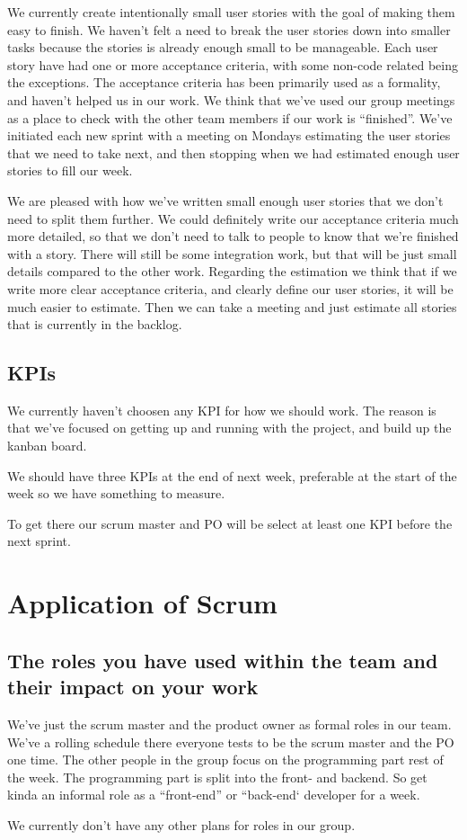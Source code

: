 \documentclass{scrartcl}
\begin{document}
We currently create intentionally small user stories with the goal of making them easy to finish.
We haven't felt a need to break the user stories down into smaller tasks because the stories is already enough small to be manageable.
Each user story have had one or more acceptance criteria, with some non-code related being the exceptions.
The acceptance criteria has been primarily used as a formality, and haven't helped us in our work.
We think that we've used our group meetings as a place to check with the other team members if our work is ``finished''.
We've initiated each new sprint with a meeting on Mondays estimating the user stories that we need to take next, and then stopping when we had estimated enough user stories to fill our week.

We are pleased with how we've written small enough user stories that we don't need to split them further.
We could definitely write our acceptance criteria much more detailed, so that we don't need to talk to people to know that we're finished with a story.
There will still be some integration work, but that will be just small details compared to the other work.
Regarding the estimation we think that if we write more clear acceptance criteria, and clearly define our user stories, it will be much easier to estimate.
Then we can take a meeting and just estimate all stories that is currently in the backlog.


\subsection{KPIs}

We currently haven't choosen any KPI for how we should work.
The reason is that we've focused on getting up and running with the project, and build up the kanban board.

We should have three KPIs at the end of next week, preferable at the start of the week so we have something to measure.

To get there our scrum master and PO will be select at least one KPI before the next sprint.

\section{Application of Scrum}

\subsection{The roles you have used within the team and their impact on your work}

We've just the scrum master and the product owner as formal roles in our team.
We've a rolling schedule there everyone tests to be the scrum master and the PO one time.
The other people in the group focus on the programming part rest of the week.
The programming part is split into the front- and backend.
So get kinda an informal role as a ``front-end'' or ``back-end` developer for a week.

We currently don't have any other plans for roles in our group.
\end{document}
